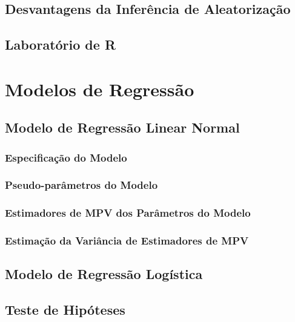 \documentclass[]{book}
\theoremstyle{definition}
\theoremstyle{definition}
\theoremstyle{definition}
\theoremstyle{remark}
\begin{document}
\section{Desvantagens da Inferência de
Aleatorização}\label{desvantagens-da-inferencia-de-aleatorizacao}

\section{Laboratório de R}\label{laboratorio-de-r-2}

\chapter{Modelos de Regressão}\label{modreg}

\section{Modelo de Regressão Linear Normal}\label{modlinear}

\subsection{Especificação do Modelo}\label{especificacao-do-modelo}

\subsection{Pseudo-parâmetros do
Modelo}\label{pseudo-parametros-do-modelo}

\subsection{Estimadores de MPV dos Parâmetros do
Modelo}\label{estimadores-de-mpv-dos-parametros-do-modelo}

\subsection{Estimação da Variância de Estimadores de
MPV}\label{estimacao-da-variancia-de-estimadores-de-mpv}

\section{Modelo de Regressão Logística}\label{modlogist}

\section{Teste de Hipóteses}\label{teste-de-hipoteses}
\end{document}
